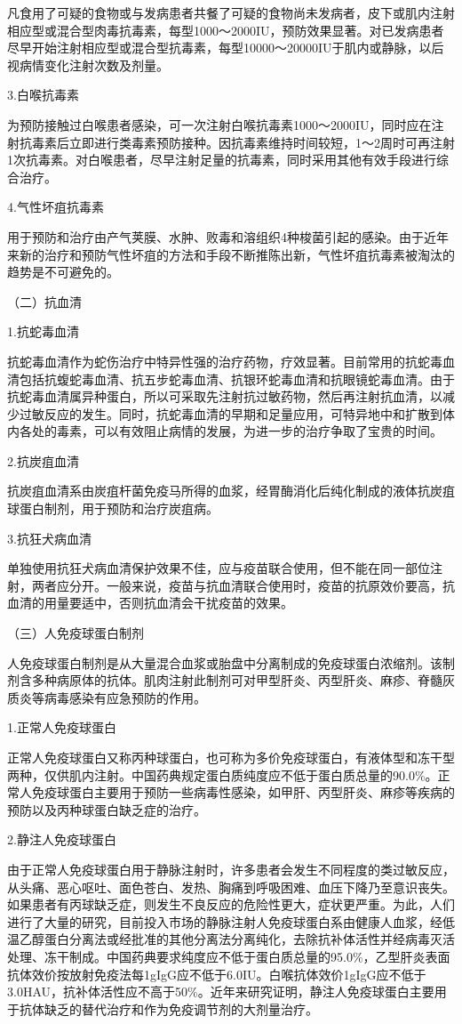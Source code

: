 凡食用了可疑的食物或与发病患者共餐了可疑的食物尚未发病者，皮下或肌内注射相应型或混合型肉毒抗毒素，每型1000～2000IU，预防效果显著。对已发病患者尽早开始注射相应型或混合型抗毒素，每型10000～20000IU于肌内或静脉，以后视病情变化注射次数及剂量。

3.白喉抗毒素

为预防接触过白喉患者感染，可一次注射白喉抗毒素1000～2000IU，同时应在注射抗毒素后立即进行类毒素预防接种。因抗毒素维持时间较短，1～2周时可再注射1次抗毒素。对白喉患者，尽早注射足量的抗毒素，同时采用其他有效手段进行综合治疗。

4.气性坏疽抗毒素

用于预防和治疗由产气荚膜、水肿、败毒和溶组织4种梭菌引起的感染。由于近年来新的治疗和预防气性坏疽的方法和手段不断推陈出新，气性坏疽抗毒素被淘汰的趋势是不可避免的。

（二）抗血清

1.抗蛇毒血清

抗蛇毒血清作为蛇伤治疗中特异性强的治疗药物，疗效显著。目前常用的抗蛇毒血清包括抗蝮蛇毒血清、抗五步蛇毒血清、抗银环蛇毒血清和抗眼镜蛇毒血清。由于抗蛇毒血清属异种蛋白，所以可采取先注射抗过敏药物，然后再注射抗血清，以减少过敏反应的发生。同时，抗蛇毒血清的早期和足量应用，可特异地中和扩散到体内各处的毒素，可以有效阻止病情的发展，为进一步的治疗争取了宝贵的时间。

2.抗炭疽血清

抗炭疽血清系由炭疽杆菌免疫马所得的血浆，经胃酶消化后纯化制成的液体抗炭疽球蛋白制剂，用于预防和治疗炭疽病。

3.抗狂犬病血清

单独使用抗狂犬病血清保护效果不佳，应与疫苗联合使用，但不能在同一部位注射，两者应分开。一般来说，疫苗与抗血清联合使用时，疫苗的抗原效价要高，抗血清的用量要适中，否则抗血清会干扰疫苗的效果。

（三）人免疫球蛋白制剂

人免疫球蛋白制剂是从大量混合血浆或胎盘中分离制成的免疫球蛋白浓缩剂。该制剂含多种病原体的抗体。肌肉注射此制剂可对甲型肝炎、丙型肝炎、麻疹、脊髓灰质炎等病毒感染有应急预防的作用。

1.正常人免疫球蛋白

正常人免疫球蛋白又称丙种球蛋白，也可称为多价免疫球蛋白，有液体型和冻干型两种，仅供肌内注射。中国药典规定蛋白质纯度应不低于蛋白质总量的90.0\%。正常人免疫球蛋白主要用于预防一些病毒性感染，如甲肝、丙型肝炎、麻疹等疾病的预防以及丙种球蛋白缺乏症的治疗。

2.静注人免疫球蛋白

由于正常人免疫球蛋白用于静脉注射时，许多患者会发生不同程度的类过敏反应，从头痛、恶心呕吐、面色苍白、发热、胸痛到呼吸困难、血压下降乃至意识丧失。如果患者有丙球缺乏症，则发生不良反应的危险性更大，症状更严重。为此，人们进行了大量的研究，目前投入市场的静脉注射人免疫球蛋白系由健康人血浆，经低温乙醇蛋白分离法或经批准的其他分离法分离纯化，去除抗补体活性并经病毒灭活处理、冻干制成。中国药典要求纯度应不低于蛋白质总量的95.0\%，乙型肝炎表面抗体效价按放射免疫法每1gIgG应不低于6.0IU。白喉抗体效价1gIgG应不低于3.0HAU，抗补体活性应不高于50\%。近年来研究证明，静注人免疫球蛋白主要用于抗体缺乏的替代治疗和作为免疫调节剂的大剂量治疗。

